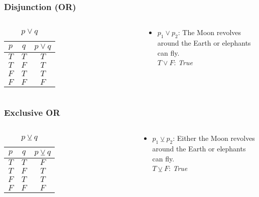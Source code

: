 \documentclass[dvipsnames]{beamer}
\begin{document}
\begin{frame}
  \frametitle{Disjunction (OR)}

  \begin{columns}
    \begin{table}
      \caption{$p \vee q$}
      \begin{tabular}{|c|c||c|}\hline
        $p$ & $q$ & $p \vee q$\\\hline\hline
        $T$ & $T$ & $T$       \\\hline
        $T$ & $F$ & $T$       \\\hline
        $F$ & $T$ & $T$       \\\hline
        $F$ & $F$ & $F$       \\\hline
      \end{tabular}
    \end{table}

    \pause
    \begin{example}
      \begin{itemize}
        \item $p_1 \vee p_2$: The Moon revolves around the Earth or elephants
          can fly.\\
          $T \vee F$: \emph{True}
      \end{itemize}
    \end{example}
  \end{columns}
\end{frame}

\begin{frame}
  \frametitle{Exclusive OR}

  \begin{columns}
    \begin{table}
      \caption{$p \veebar q$}
      \begin{tabular}{|c|c||c|}\hline
        $p$ & $q$ & $p \veebar q$\\\hline\hline
        $T$ & $T$ & $F$          \\\hline
        $T$ & $F$ & $T$          \\\hline
        $F$ & $T$ & $T$          \\\hline
        $F$ & $F$ & $F$          \\\hline
      \end{tabular}
    \end{table}

    \pause
    \begin{example}
      \begin{itemize}
        \item $p_1 \veebar p_2$: Either the Moon revolves around the Earth or
          elephants can fly.\\
          $T \veebar F$: \emph{True}
      \end{itemize}
    \end{example}
  \end{columns}
\end{frame}
\end{document}
